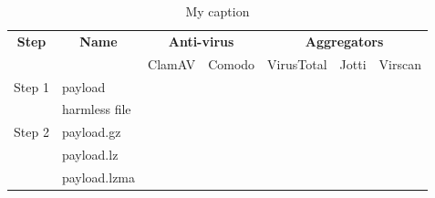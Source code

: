 \documentclass{article}           %
\title{}     %
\author{}        %
\begin{document}

\begin{table}[]
\centering
\caption{My caption}
\label{my-label}
\begin{tabular}{llllllll}
\hline
\multicolumn{1}{|c|}{\multirow{2}{*}{\textbf{Step}}} & \multicolumn{2}{c|}{\multirow{2}{*}{\textbf{Name}}}                         & \multicolumn{2}{c|}{\textbf{Anti-virus}}                  & \multicolumn{3}{c|}{\textbf{Aggregators}}                                                   \\ \cline{4-8} 
\multicolumn{1}{|c|}{}                               & \multicolumn{2}{c|}{}                                                       & \multicolumn{1}{c|}{ClamAV} & \multicolumn{1}{c|}{Comodo} & \multicolumn{1}{c|}{VirusTotal} & \multicolumn{1}{c|}{Jotti} & \multicolumn{1}{c|}{Virscan} \\ \hline
\multicolumn{1}{|l|}{\multirow{2}{*}{Step 1}}        & \multicolumn{2}{l|}{payload}                                                & \multicolumn{1}{l|}{}       & \multicolumn{1}{l|}{}       & \multicolumn{1}{l|}{}           & \multicolumn{1}{l|}{}      & \multicolumn{1}{l|}{}        \\ \cline{2-8} 
\multicolumn{1}{|l|}{}                               & \multicolumn{2}{l|}{harmless file}                                          & \multicolumn{1}{l|}{}       & \multicolumn{1}{l|}{}       & \multicolumn{1}{l|}{}           & \multicolumn{1}{l|}{}      & \multicolumn{1}{l|}{}        \\ \hline
\multicolumn{1}{|l|}{\multirow{8}{*}{Step 2}}        & \multicolumn{2}{l|}{payload.gz}                                             & \multicolumn{1}{l|}{}       & \multicolumn{1}{l|}{}       & \multicolumn{1}{l|}{}           & \multicolumn{1}{l|}{}      & \multicolumn{1}{l|}{}        \\ \cline{2-8} 
\multicolumn{1}{|l|}{}                               & \multicolumn{2}{l|}{payload.lz}                                             & \multicolumn{1}{l|}{}       & \multicolumn{1}{l|}{}       & \multicolumn{1}{l|}{}           & \multicolumn{1}{l|}{}      & \multicolumn{1}{l|}{}        \\ \cline{2-8} 
\multicolumn{1}{|l|}{}                               & \multicolumn{2}{l|}{payload.lzma}                                           & \multicolumn{1}{l|}{}       & \multicolumn{1}{l|}{}       & \multicolumn{1}{l|}{}           & \multicolumn{1}{l|}{}      & \multicolumn{1}{l|}{}        \\ \cline{2-8} 

\end{tabular}
\end{table}
\end{document}
